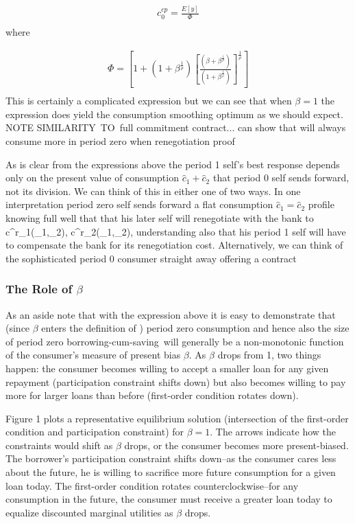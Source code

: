 \documentclass[11pt]{article}%
\begin{document}
\begin{align*}
c_{0}^{cp}=\frac{E[y]}{\Phi}\\
\end{align*}
where

\begin{align*}
\Phi=\left[1+(1+\beta^{\frac{1}{\rho}})
\left[\frac{(\beta+\beta^{\frac{1}{\rho}})}{(1+\beta^\frac{1}{\rho})}\right]^{\frac{1}{\rho}}
\right]\\
\end{align*}
This is certainly a complicated expression but we can see that when \(\beta=1\) the expression does yield the consumption smoothing optimum as we should expect.
NOTE  SIMILARITY\ TO\ full commitment contract... can show that will always consume more in period zero when renegotiation proof \textbraceright

 As is clear from the expressions above the period 1 self's best response depends only on the present value of consumption  
\(\widehat{c}_{1}+\widehat{c}_{2}\) that period 0 self sends forward, not its division. We
can think of this in either one of two ways.  In one interpretation period zero self sends forward a flat consumption \(\widehat{c}_{1}=\widehat{c}_{2}\) profile knowing full well that that his later self will renegotiate with the bank to c^{r}_{1}(_1,_2),  c^{r}_{2}(_1,_2)\), understanding also that his period 1 self will have to compensate the bank for its renegotiation cost. Alternatively, we can think of the sophisticated period 0 consumer straight away offering a contract 
\subsubsection{The Role of $\beta$}

As an aside note that with the expression above it is easy to demonstrate that (since \(\beta\) enters the definition of \)  ) period zero consumption and hence also the size of period zero borrowing-cum-saving\ will generally be a non-monotonic function of the consumer's measure of present bias
$\beta$. As $\beta$ drops from 1, two things happen: the consumer becomes
willing to accept a smaller loan for any given repayment (participation
constraint shifts down) but also becomes willing to pay more for larger loans
than before (first-order condition rotates down).

Figure 1 plots a representative equilibrium solution (intersection of the
first-order condition and participation constraint) for $\beta=1$. The arrows
indicate how the constraints would shift as $\beta$ drops, or the consumer
becomes more present-biased. The borrower's participation constraint shifts
down--as the consumer cares less about the future, he is willing to sacrifice
more future consumption for a given loan today. The first-order condition
rotates counterclockwise--for any consumption in the future, the consumer must
receive a greater loan today to equalize discounted marginal utilities as
$\beta$ drops.
\end{document}
